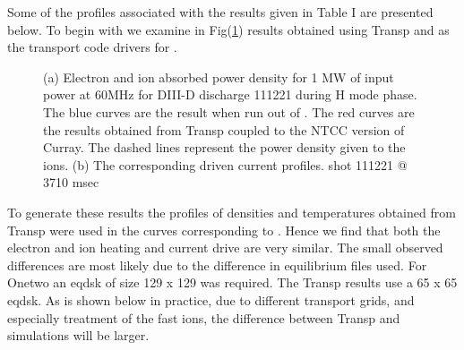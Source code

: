  Some of the profiles associated with the results given in Table I are
 presented below. 
 To begin with we examine in Fig(\ref{Figbwav2a}) results obtained
 using Transp and \ot as the transport code drivers for \ct.  
 \begin{figure}[hbt] %
\begin{narrow}{-.50in}{0in} 
 \mbox{}
\end{narrow}
 \caption{ (a) Electron and ion absorbed power density for 1 MW of input
  power at 60MHz for DIII-D discharge 111221 during  H mode phase. The blue curves are the \ct result when run out of  \ot. The red
  curves are the results obtained from Transp coupled to the NTCC
  version of Curray. The dashed lines represent the power density
  given to the ions.
(b) The corresponding driven current profiles.
shot 111221 @ 3710 msec} 
  \label{Figbwav2a}
 \end{figure}
To generate these results the profiles of densities and temperatures
obtained from Transp were used in the curves corresponding to \ot
.  Hence we find that both the electron and ion
heating  and current drive are very similar. The small observed
differences  are most likely due to the difference
in equilibrium files used. For Onetwo an eqdsk of size 129 x 129 was
required. The Transp results use a 65 x 65 eqdsk.
 As is shown below
in practice, due to
different transport grids, and especially treatment of the fast ions,
the difference between Transp and \ot simulations will be larger. 

